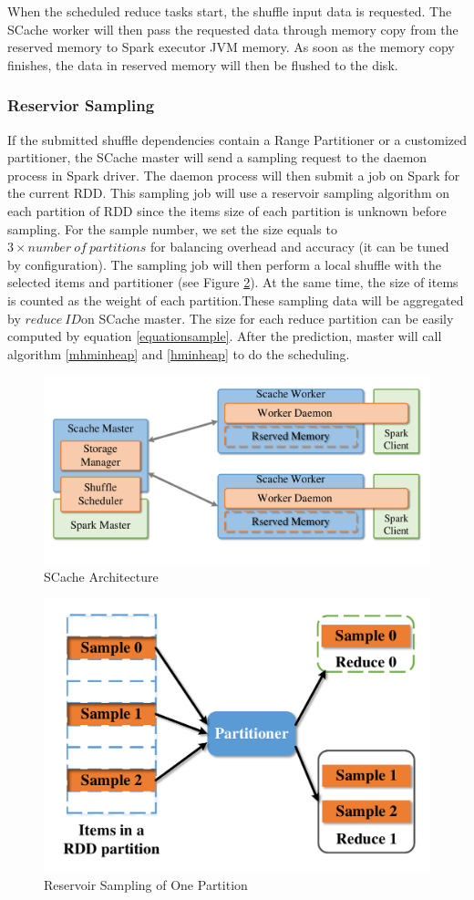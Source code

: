 When the scheduled reduce tasks start, the shuffle input data is requested. The SCache worker will then pass the requested data through memory copy from the reserved memory to Spark executor JVM memory. As soon as the memory copy finishes, the data in reserved memory will then be flushed to the disk.

\subsubsection{Reservior Sampling}\label{sampling}
If the submitted shuffle dependencies contain a Range Partitioner or a customized partitioner, the SCache master will send a sampling request to the daemon process in Spark driver. The daemon process will then submit a job on Spark for the current RDD. This sampling job will use a reservoir sampling algorithm\cite{reservoir} on each partition of RDD since the items size of each partition is unknown before sampling. For the sample number, we set the size equals to $3 \times number\ of\ partitions$ for balancing overhead and accuracy (it can be tuned by configuration). The sampling job will then perform a local shuffle with the selected items and partitioner (see Figure \ref{fig:sample}). At the same time, the size of items is counted as the weight of each partition.These sampling data will be aggregated by $reduce\ ID$on SCache master. The size for each reduce partition can be easily computed by equation \ref{equationsample}. After the prediction, master will call algorithm \ref{mhminheap} and \ref{hminheap} to do the scheduling. 

\begin{figure}
	\centering
	\includegraphics[width=0.9\linewidth]{fig/arch}
	\caption{SCache Architecture}
	\label{fig:arch}
\end{figure}
\begin{figure}
	\centering
	\includegraphics[width=0.7\linewidth]{fig/sample}
	\caption{Reservoir Sampling of One Partition}
	\label{fig:sample}
\end{figure}

